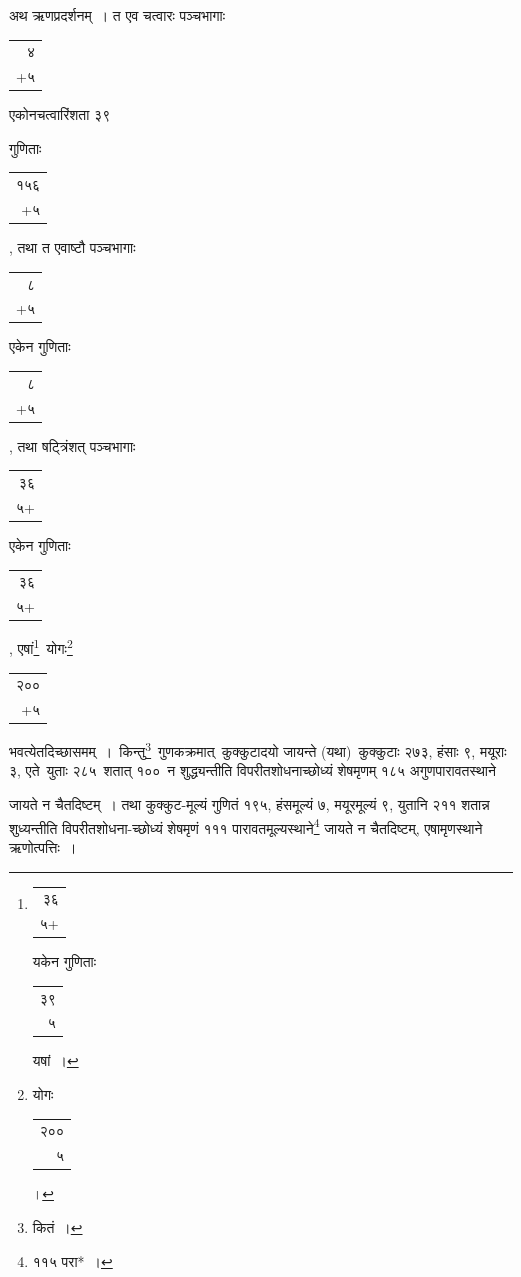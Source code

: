 \documentclass[10pt, openany]{book}
\begin{document}
{{ {अथ ऋणप्रदर्शनम्~। त एव चत्वारः पञ्चभागाः\begin{tabular}{r}
४  \\
+५ 
\end{tabular}एकोनचत्वारिंशता ३९}
{गुणिताः\begin{tabular}{r}
१५६\\
+५
\end{tabular}, तथा त एवाष्टौ पञ्चभागाः\begin{tabular}{r}
  ८     \\
  +५   
\end{tabular}एकेन गुणिताः\begin{tabular}{r}
  ८     \\
  +५   
\end{tabular}, तथा
षट्त्रिंशत् पञ्चभागाः\begin{tabular}{r}
३६ \\
५+ 
\end{tabular}एकेन गुणिताः\begin{tabular}{r}
३६ \\
५+ 
\end{tabular}, एषां\renewcommand{\thefootnote}{\s १}\footnote{\s \begin{tabular}{r}
३६ \\
५+ 
\end{tabular}यकेन गुणिताः\begin{tabular}{r}
३९ \\
५ 
\end{tabular}यषां~।} \,योगः\renewcommand{\thefootnote}{\s २}\footnote{\s योगः\begin{tabular}{r}
२००\\
५ 
\end{tabular}।}\begin{tabular}{r}
२००\\
+५
\end{tabular}भवत्येतदिच्छासमम्~। \,किन्तु\renewcommand{\thefootnote}{\s ३}\footnote{\s कितं~।} \,गुणकक्रमात् \,कुक्कुटादयो जायन्ते (यथा) \,कुक्कुटाः २७३, हंसाः ९, मयूराः ३, एते \,युताः २८५ \,शतात् १०० \,न शुद्ध्यन्तीति विपरीतशोधनाच्छोध्यं शेषमृणम् १८५
अगुणपारावतस्थाने}
{जायते न चैतदिष्टम्~। तथा कुक्कुट-मूल्यं गुणितं १९५, हंसमूल्यं ७,
मयूरमूल्यं ९, युतानि}
{२११ शतान्न शुध्यन्तीति विपरीतशोधना-च्छोध्यं शेषमृणं १११
पारावतमूल्यस्थाने\renewcommand{\thefootnote}{\s ४}\footnote{\s ११५ परा*~।} जायते न}
{चैतदिष्टम्, एषामृणस्थाने ऋणोत्पत्तिः~।}
\vspace{-1mm}

}}
\end{document}
